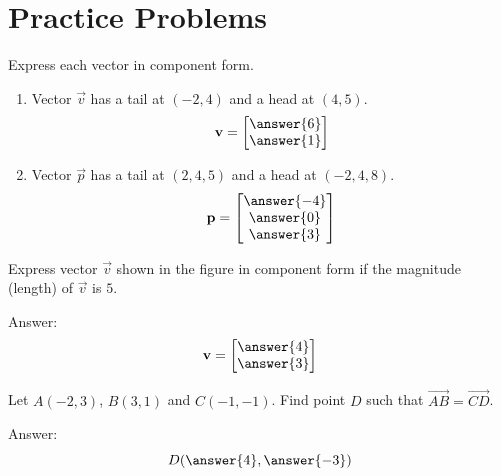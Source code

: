 \documentclass{ximera}
\begin{document}
\section*{Practice Problems}

\begin{problem}\label{prob:componentform1}

  Express each vector in component form. 
  \begin{enumerate}
\item
Vector $\vec{v}$ has a tail at $(-2,4)$ and a head at $(4,5)$. 
$$\vec{v}=\begin{bmatrix}\answer{6}\\ \answer{1}\end{bmatrix}$$
\item
Vector $\vec{p}$ has a tail at $(2,4,5)$ and a head at $(-2,4,8)$. 
$$\vec{p}=\begin{bmatrix}\answer{-4}\\\answer{0}\\\answer{3}\end{bmatrix}$$
 \end{enumerate}
\end{problem}
 

\begin{problem}\label{prob:compformgivenlength}
Express vector $\vec{v}$ shown in the figure  in component form if the magnitude (length) of $\vec{v}$ is $5$.

\begin{center}
\end{center}

Answer:
$$\vec{v}=\begin{bmatrix}\answer{4}\\\answer{3}\end{bmatrix}$$
\end{problem}

\begin{problem}\label{prob:compformpractice} Let $A(-2, 3)$, $B(3, 1)$ and $C(-1, -1)$.  Find point $D$ such that $\overrightarrow{AB}=\overrightarrow{CD}$.

Answer:
$$D(\answer{4}, \answer{-3})$$
\end{problem}
\end{document}
